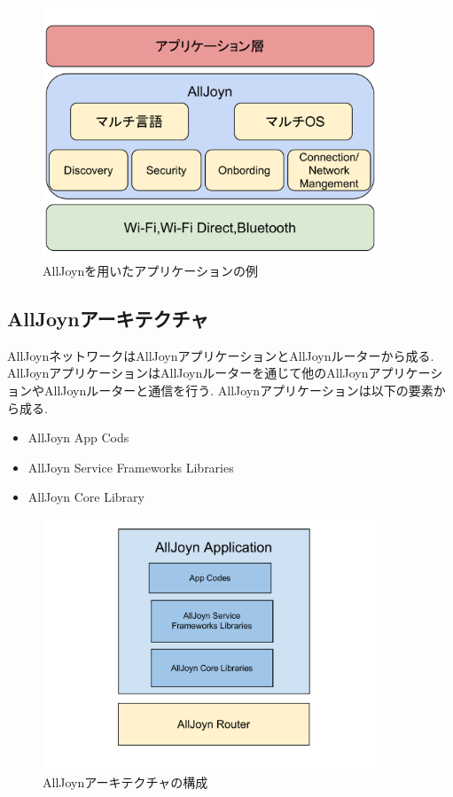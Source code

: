 \begin{figure}[htbp]
\centering
\includegraphics[width=10cm]{fig/AllJoyn_App.pdf}
\caption{AllJoynを用いたアプリケーションの例}
\end{figure}

\subsection{AllJoynアーキテクチャ}

AllJoynネットワークはAllJoynアプリケーションとAllJoynルーターから成る.
AllJoynアプリケーションはAllJoynルーターを通じて他のAllJoynアプリケーションやAllJoynルーターと通信を行う.
AllJoynアプリケーションは以下の要素から成る.

\begin{itemize}
\item AllJoyn App Cods
\item AllJoyn Service Frameworks Libraries
\item AllJoyn Core Library
\end{itemize}

\begin{figure}[htbp]
\centering
\includegraphics[width=10cm]{fig/AllJoyn.pdf}
\caption{AllJoynアーキテクチャの構成}
\end{figure}


